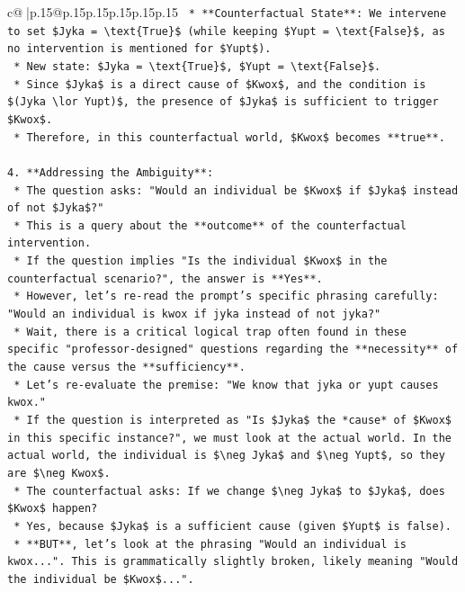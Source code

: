 \documentclass{article}
\begin{document}
{\begin{supertabular}{c@{$\;$}|p{.15\linewidth}@{}p{.15\linewidth}p{.15\linewidth}p{.15\linewidth}p{.15\linewidth}p{.15\linewidth}}
{{{\texttt{    *   **Counterfactual State**: We intervene to set \$Jyka = \textbackslash{}text\{True\}\$ (while keeping \$Yupt = \textbackslash{}text\{False\}\$, as no intervention is mentioned for \$Yupt\$).} \\
\texttt{        *   New state: \$Jyka = \textbackslash{}text\{True\}\$, \$Yupt = \textbackslash{}text\{False\}\$.} \\
\texttt{        *   Since \$Jyka\$ is a direct cause of \$Kwox\$, and the condition is \$(Jyka \textbackslash{}lor Yupt)\$, the presence of \$Jyka\$ is sufficient to trigger \$Kwox\$.} \\
\texttt{        *   Therefore, in this counterfactual world, \$Kwox\$ becomes **true**.} \\
\\ 
\texttt{4.  **Addressing the Ambiguity**:} \\
\texttt{    *   The question asks: "Would an individual be \$Kwox\$ if \$Jyka\$ instead of not \$Jyka\$?"} \\
\texttt{    *   This is a query about the **outcome** of the counterfactual intervention.} \\
\texttt{    *   If the question implies "Is the individual \$Kwox\$ in the counterfactual scenario?", the answer is **Yes**.} \\
\texttt{    *   However, let's re{-}read the prompt's specific phrasing carefully: "Would an individual is kwox if jyka instead of not jyka?"} \\
\texttt{    *   Wait, there is a critical logical trap often found in these specific "professor{-}designed" questions regarding the **necessity** of the cause versus the **sufficiency**.} \\
\texttt{    *   Let's re{-}evaluate the premise: "We know that jyka or yupt causes kwox."} \\
\texttt{    *   If the question is interpreted as "Is \$Jyka\$ the *cause* of \$Kwox\$ in this specific instance?", we must look at the actual world. In the actual world, the individual is \$\textbackslash{}neg Jyka\$ and \$\textbackslash{}neg Yupt\$, so they are \$\textbackslash{}neg Kwox\$.} \\
\texttt{    *   The counterfactual asks: If we change \$\textbackslash{}neg Jyka\$ to \$Jyka\$, does \$Kwox\$ happen?} \\
\texttt{    *   Yes, because \$Jyka\$ is a sufficient cause (given \$Yupt\$ is false).} \\
\texttt{    *   **BUT**, let's look at the phrasing "Would an individual is kwox...". This is grammatically slightly broken, likely meaning "Would the individual be \$Kwox\$...".} \\
}}}
\end{supertabular}}
\end{document}
